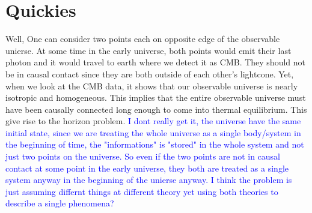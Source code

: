 \section{Quickies}
Well, One can consider two points each on opposite edge of the observable unierse. At some time in the early universe, both points would emit their last photon and it would travel to earth where we detect it as CMB. They should not be in causal contact since they are both outside of each other's lightcone. Yet, when we look at the CMB data, it shows that our observable  universe is nearly isotropic and  homogeneous. This implies that the entire observable universe must have been causally connected long enough to come into thermal equilibrium. This give rise to the horizon problem. 
\textcolor{blue}{I dont really get it, the universe have the same initial state, since we are treating the whole universe as a single body/system in the beginning of time, the "informations" is "stored" in the whole system and not just two points on the universe. So even if the two points are not in causal contact at some point in the early universe, they both are treated as a single system anyway in the beginning of the unierse anyway. I think the problem is just assuming differnt things at different theory yet using both theories to describe a single phenomena?}
